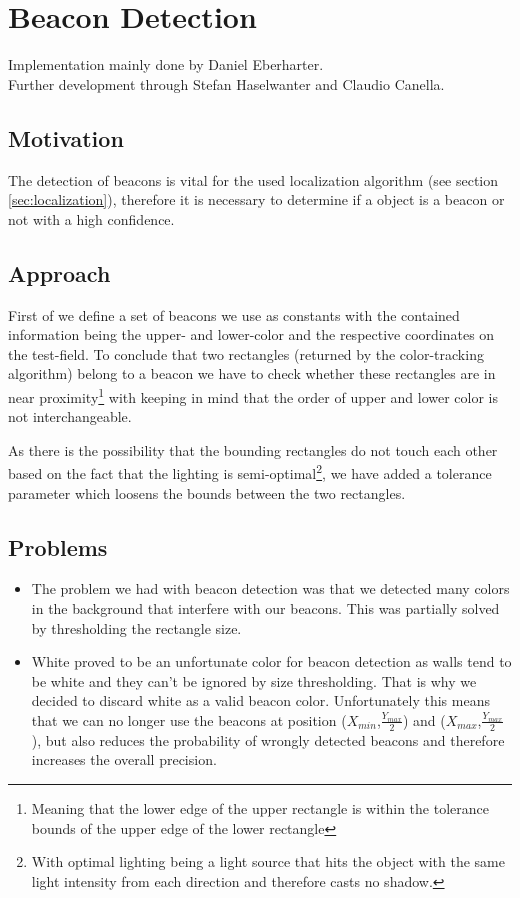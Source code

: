 \documentclass[703031]{iisreport}
\begin{document}
\section{Beacon Detection}
Implementation mainly done by Daniel Eberharter. \\
Further development through Stefan Haselwanter and Claudio Canella.

\subsection{Motivation}
The detection of beacons is vital for the used localization algorithm (see section \ref{sec:localization}), therefore it is necessary to determine if a object is a beacon or not with a high confidence.

\subsection{Approach}
First of we define a set of beacons we use as constants with the contained information being the upper- and lower-color and the respective coordinates on the test-field. To conclude that two rectangles (returned by the color-tracking algorithm) belong to a beacon we have to check whether these rectangles are in near proximity\footnote{Meaning that the lower edge of the upper rectangle is within the tolerance bounds of the upper edge of the lower rectangle} with keeping in mind that the order of upper and lower color is not interchangeable.

As there is the possibility that the bounding rectangles do not touch each other based on the fact that the lighting is semi-optimal\footnote{With optimal lighting being a light source that hits the object with the same light intensity from each direction and therefore casts no shadow.}, we have added a tolerance parameter which loosens the bounds between the two rectangles.

\subsection{Problems}
	\begin{itemize}
		\item The problem we had with beacon detection was that we detected many colors in the background that interfere with our beacons. This was partially solved by thresholding the rectangle size.
		\item White proved to be an unfortunate color for beacon detection as walls tend to be white and they can't be ignored by size thresholding. That is why we decided to discard white as a valid beacon color. Unfortunately this means that we can no longer use the beacons at position ($X_{min}$,$\frac{Y_{max}}{2}$) and ($X_{max}$,$\frac{Y_{max}}{2}$), but also reduces the probability of wrongly detected beacons and therefore increases the overall precision.
	\end{itemize}
\end{document}
